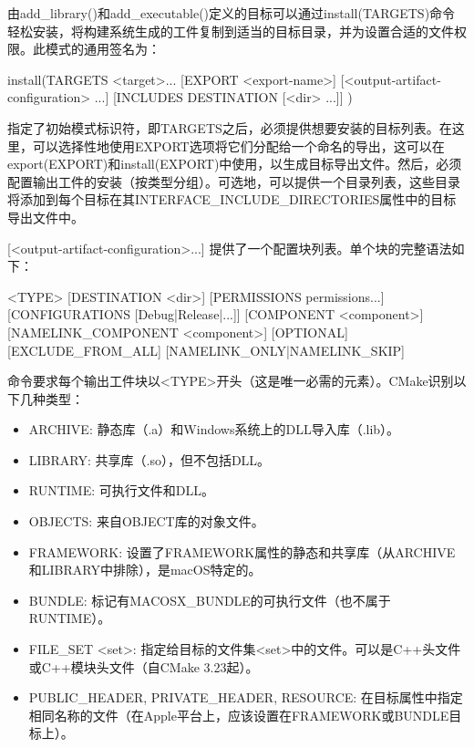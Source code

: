 
由add\_library()和add\_executable()定义的目标可以通过install(TARGETS)命令轻松安装，将构建系统生成的工件复制到适当的目标目录，并为设置合适的文件权限。此模式的通用签名为：

\begin{shell}
install(TARGETS <target>... [EXPORT <export-name>]
        [<output-artifact-configuration> ...]
        [INCLUDES DESTINATION [<dir> ...]]
)
\end{shell}

指定了初始模式标识符，即TARGETS之后，必须提供想要安装的目标列表。在这里，可以选择性地使用EXPORT选项将它们分配给一个命名的导出，这可以在export(EXPORT)和install(EXPORT)中使用，以生成目标导出文件。然后，必须配置输出工件的安装（按类型分组）。可选地，可以提供一个目录列表，这些目录将添加到每个目标在其INTERFACE\_INCLUDE\_DIRECTORIES属性中的目标导出文件中。

[<output-artifact-configuration>...] 提供了一个配置块列表。单个块的完整语法如下：

\begin{shell}
<TYPE> [DESTINATION <dir>]
       [PERMISSIONS permissions...]
       [CONFIGURATIONS [Debug|Release|...]]
       [COMPONENT <component>]
       [NAMELINK_COMPONENT <component>]
       [OPTIONAL] [EXCLUDE_FROM_ALL]
       [NAMELINK_ONLY|NAMELINK_SKIP]
\end{shell}

命令要求每个输出工件块以<TYPE>开头（这是唯一必需的元素）。CMake识别以下几种类型：

\begin{itemize}
\item
ARCHIVE: 静态库（.a）和Windows系统上的DLL导入库（.lib）。

\item
LIBRARY: 共享库（.so），但不包括DLL。

\item
RUNTIME: 可执行文件和DLL。

\item
OBJECTS: 来自OBJECT库的对象文件。

\item
FRAMEWORK: 设置了FRAMEWORK属性的静态和共享库（从ARCHIVE和LIBRARY中排除），是macOS特定的。

\item
BUNDLE: 标记有MACOSX\_BUNDLE的可执行文件（也不属于RUNTIME）。

\item
FILE\_SET <set>: 指定给目标的文件集<set>中的文件。可以是C++头文件或C++模块头文件（自CMake 3.23起）。

\item
PUBLIC\_HEADER, PRIVATE\_HEADER, RESOURCE: 在目标属性中指定相同名称的文件（在Apple平台上，应该设置在FRAMEWORK或BUNDLE目标上）。
\end{itemize}

